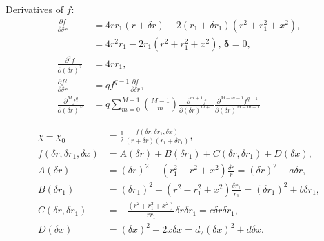 \documentclass[a4paper,12pt]{article}
\begin{document}
Derivatives of $f$:
\begin{align}
  \frac{\partial f}{\partial \delta r}
  &=
  4rr_{1}(r+\delta r) - 2(r_{1}+\delta r_{1})(r^{2}+r_{1}^{2}+x^{2}),\\
  &= 4r^{2}r_{1} - 2r_{1}(r^{2}+r_{1}^{2}+x^{2}),\,\mathbf{\delta}=0,\\
  \frac{\partial^{2} f}{\partial (\delta r)^{2}}
  &=
  4rr_{1},\\
  \frac{\partial f^{q}}{\partial \delta r}
  &=
  qf^{q-1}\frac{\partial f}{\partial \delta r},\\
  \frac{\partial^{M} f^{q}}{\partial (\delta r)^{M}}
  &=
  q\sum_{m=0}^{M-1}
  \binom{M-1}{m}
  \frac{\partial^{m+1} f}{\partial (\delta r)^{m+1}}
  \frac{\partial^{M-m-1}f^{q-1}}{\partial (\delta r)^{M-m-1}}
\end{align}

\begin{align}
  \chi - \chi_{0}
  &=
  \frac{1}{2}\frac{f(\delta r, \delta r_{1}, \delta x)}{(r+\delta
    r)(r_{1}+\delta r_{1})},\\
  f(\delta r, \delta r_{1}, \delta x)
  &=
  A(\delta r) + B(\delta r_{1}) +  C(\delta r, \delta r_{1})
  + D(\delta x),\\
  A(\delta r) &=
  \left(\delta r\right)^{2} -
  \left(r_{1}^{2} - r^{2} + x^{2}\right)\frac{\delta r}{r}
  =
  \left(\delta r\right)^{2} + a\delta r,\\
  B(\delta r_{1}) &=
  \left(\delta r_{1}\right)^{2} -
  \left(r^{2} - r_{1}^{2} + x^{2}\right)\frac{\delta r_{1}}{r_{1}}
    =
  \left(\delta r_{1}\right)^{2} + b\delta r_{1},\\
  C(\delta r, \delta r_{1})
  &=
  -\frac{(r^{2} + r_{1}^{2} + x^{2})}{rr_{1}}\delta r \delta r_{1}
  =
  c\delta r\delta r_{1},
  \\
  D(\delta x)
  &=
  \left(\delta x\right)^{2} + 2x\delta x
  =
  d_{2}\left(\delta x\right)^{2} + d\delta x.  
\end{align}
\end{document}
